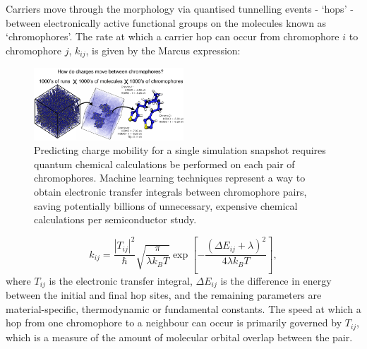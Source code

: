\documentclass[12pt]{article}
\begin{document}
Carriers move through the morphology via quantised tunnelling events - `hops' - between electronically active functional groups on the molecules known as `chromophores'.
The rate at which a carrier hop can occur from chromophore $i$ to chromophore $j$, $k_{ij}$, is given by the Marcus expression\cite{Marcus1964}:
\begin{figure}\centering
	\includegraphics[width=0.5\textwidth]{Figures/fig.png}
    \caption{Predicting charge mobility for a single simulation snapshot requires quantum chemical calculations be performed on each pair of chromophores. Machine learning techniques represent a way to obtain electronic transfer integrals between chromophore pairs, saving potentially billions of unnecessary, expensive chemical calculations per semiconductor study.}
	\label{fig:fig1}
\end{figure}
\begin{equation}\label{eq:Marcus}
    k_{ij} = \frac{\left| T_{ij} \right|^{2}}{\hbar} \sqrt{\frac{\pi}{\lambda k_{B} T}} \exp \left[ - \frac{(\Delta E_{ij} + \lambda)^{2}}{4 \lambda k_{B} T} \right],
\end{equation}
where $T_{ij}$ is the electronic transfer integral, $\Delta E_{ij}$ is the difference in energy between the initial and final hop sites, and the remaining parameters are material-specific, thermodynamic or fundamental constants.
The speed at which a hop from one chromophore to a neighbour can occur is primarily governed by $T_{ij}$, which is a measure of the amount of molecular orbital overlap between the pair.
\end{document}
